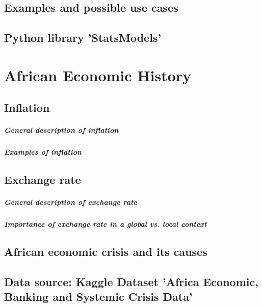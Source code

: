 \section{Examples and possible use cases}\label{forecasting_examples}
  
\section{Python library 'StatsModels'}\label{statsmodels}          
              
\chapter{African Economic History}\label{african_eco_hist}

\section{Inflation}\label{inflation}

\paragraph{General description of inflation}

\paragraph{Examples of inflation}

\section{Exchange rate}\label{exchange_rate}

\paragraph{General description of exchange rate}

\paragraph{Importance of exchange rate in a global vs. local context}

\section{African economic crisis and its causes}\label{crisis}
   
\section{Data source: Kaggle Dataset 'Africa Economic, Banking and Systemic Crisis Data'}\label{datasource}

